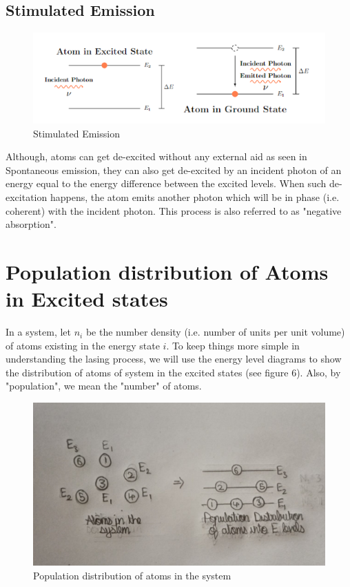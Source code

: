 \documentclass[12pt]{article}
\begin{document}
\subsection{Stimulated Emission}

\begin{figure}[H]
    \centering
    \includegraphics[scale=0.8]{./img/05_stimulated_emission.png}
    \caption{Stimulated Emission}
\end{figure}

Although, atoms can get de-excited without any external aid as seen in Spontaneous emission, they can also get de-excited by an incident photon of an energy equal to the energy difference between the excited levels. When such de-excitation happens, the atom emits another photon which will be in phase (i.e. coherent) with the incident photon. This process is also referred to as "negative absorption".

\section{Population distribution of Atoms in Excited states}

In a system, let $n_{i}$ be the number density (i.e. number of units per unit volume) of atoms existing in the energy state $i$. To keep things more simple in understanding the lasing process, we will use the energy level diagrams to show the distribution of atoms of system in the excited states (see figure 6). Also, by "population", we mean the "number" of atoms.

\begin{figure}[H]
    \centering
    \includegraphics[scale=.8]{./img/06_population_dist.png}
    \caption{Population distribution of atoms in the system}
\end{figure}
\end{document}
